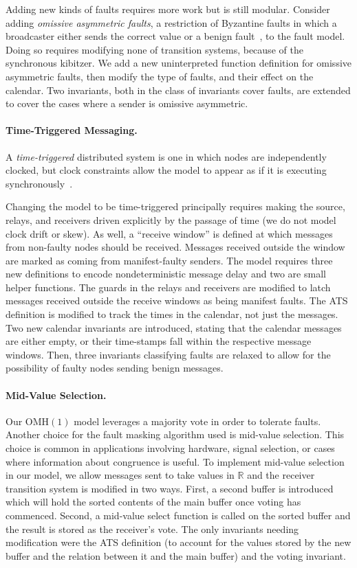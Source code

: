 \documentclass{llncs/llncs}
\newcommand{\OMH}{\ensuremath{\mathrm{OMH}}\xspace}
\begin{document}
{Adding new kinds of faults requires more work but is still modular. Consider adding \emph{omissive asymmetric faults}, a restriction of Byzantine faults in which a broadcaster either sends the correct value or a benign fault~\cite{omissive}, to the fault model. Doing so requires modifying none of transition systems, because of the synchronous kibitzer. We add a new uninterpreted function definition for omissive asymmetric faults, then modify the type of faults, and their effect on the calendar. Two invariants, both in the class of invariants cover faults, are extended to cover the cases where a sender is omissive asymmetric.

\paragraph{Time-Triggered Messaging.}
A \emph{time-triggered} distributed system is one in which nodes are independently clocked, but clock constraints allow the model to appear as if it is executing synchronously~\cite{kopetz}.

Changing the model to be time-triggered principally requires making the source, relays, and receivers driven explicitly by the passage of time (we do not model clock drift or skew). As well, a ``receive window'' is defined at which messages from non-faulty nodes should be received. Messages received outside the window are marked as coming from manifest-faulty senders. The model requires three new definitions to  encode nondeterministic message delay and two are small helper functions. The guards in the relays and receivers are modified to latch messages received outside the receive windows as being manifest faults. The ATS definition is modified to track the times in the calendar, not just the messages. Two new calendar invariants are introduced, stating that the calendar messages are either empty, or their time-stamps fall within the respective message windows. Then, three invariants classifying faults are relaxed to allow for the possibility of faulty nodes sending benign messages.

\paragraph{Mid-Value Selection.}
Our $\OMH(1)$ model leverages a majority vote in order to tolerate faults. Another choice for the fault masking algorithm used is mid-value selection. This choice is common in applications involving hardware, signal selection, or cases where information about congruence is useful. To implement mid-value selection in our model, we allow messages sent to take values in $\mathbb{R}$ and the receiver transition system is modified in two ways. First, a second buffer is introduced which will hold the sorted contents of the main buffer once voting has commenced. Second, a mid-value select function is called on the sorted buffer and the result is stored as the receiver's vote. The only invariants needing modification were the ATS definition (to account for the values stored by the new buffer and the relation between it and the main buffer) and the voting invariant.


}
\end{document}
